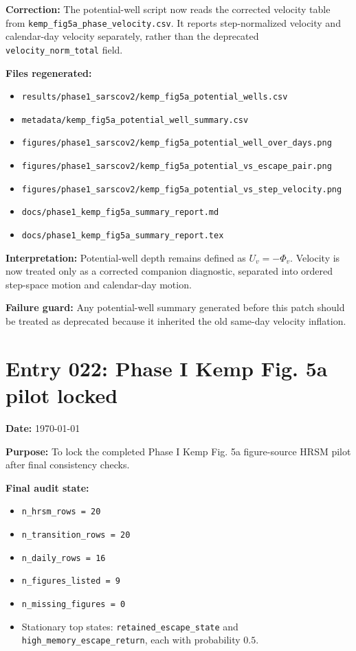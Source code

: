 \textbf{Correction:} The potential-well script now reads the corrected velocity table from \texttt{kemp\_fig5a\_phase\_velocity.csv}. It reports step-normalized velocity and calendar-day velocity separately, rather than the deprecated \texttt{velocity\_norm\_total} field.

\textbf{Files regenerated:}
\begin{itemize}
    \item \texttt{results/phase1\_sarscov2/kemp\_fig5a\_potential\_wells.csv}
    \item \texttt{metadata/kemp\_fig5a\_potential\_well\_summary.csv}
    \item \texttt{figures/phase1\_sarscov2/kemp\_fig5a\_potential\_well\_over\_days.png}
    \item \texttt{figures/phase1\_sarscov2/kemp\_fig5a\_potential\_vs\_escape\_pair.png}
    \item \texttt{figures/phase1\_sarscov2/kemp\_fig5a\_potential\_vs\_step\_velocity.png}
    \item \texttt{docs/phase1\_kemp\_fig5a\_summary\_report.md}
    \item \texttt{docs/phase1\_kemp\_fig5a\_summary\_report.tex}
\end{itemize}

\textbf{Interpretation:} Potential-well depth remains defined as \(U_v=-\Phi_v\). Velocity is now treated only as a corrected companion diagnostic, separated into ordered step-space motion and calendar-day motion.

\textbf{Failure guard:} Any potential-well summary generated before this patch should be treated as deprecated because it inherited the old same-day velocity inflation.


\section*{Entry 022: Phase I Kemp Fig. 5a pilot locked}

\textbf{Date:} \today

\textbf{Purpose:} To lock the completed Phase I Kemp Fig. 5a figure-source HRSM pilot after final consistency checks.

\textbf{Final audit state:}
\begin{itemize}
    \item \texttt{n\_hrsm\_rows = 20}
    \item \texttt{n\_transition\_rows = 20}
    \item \texttt{n\_daily\_rows = 16}
    \item \texttt{n\_figures\_listed = 9}
    \item \texttt{n\_missing\_figures = 0}
    \item Stationary top states: \texttt{retained\_escape\_state} and \texttt{high\_memory\_escape\_return}, each with probability \(0.5\).
\end{itemize}

